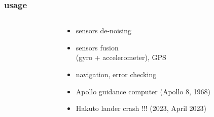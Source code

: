 \documentclass{beamer}
\begin{document}
\begin{frame}
  
  \frametitle{\bf usage}    

    \begin{columns}

      \begin{column}{0.5\textwidth}
      \end{column}
  
      \begin{column}{0.5\textwidth}
        \begin{itemize}
          \item sensors de-noising 
          \item sensors fusion \\ (gyro + accelerometer), GPS
          \item navigation, error checking
          \item Apollo guidance computer (Apollo 8, 1968)
          \item Hakuto lander crash !!! (2023, April 2023)
        \end{itemize}
      \end{column}
  

\end{columns}
\end{frame}
\end{document}
